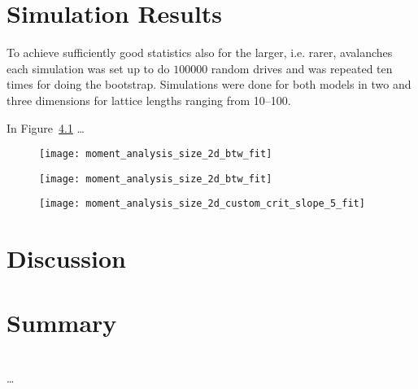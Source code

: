 \section{Simulation Results}
\label{sec:results}
To achieve sufficiently good statistics also for the larger, i.e. rarer, avalanches each simulation was set up to
do $100000$ random drives and was repeated ten times for doing the bootstrap. Simulations were done for both models
in two and three dimensions for lattice lengths ranging from \SIrange{10}{100}{}.

In Figure~\ref{} \dots %

\begin{figure}[htb]
    \centering
    \texttt{[image: moment\_analysis\_size\_2d\_btw\_fit]}
    \caption{}
    \label{fig:}
\end{figure}


\begin{figure}[htb]
    \centering
    \texttt{[image: moment\_analysis\_size\_2d\_btw\_fit]}
    \caption{}
    \label{fig:}
\end{figure}
\begin{figure}[htb]
    \centering
    \texttt{[image: moment\_analysis\_size\_2d\_custom\_crit\_slope\_5\_fit]}
    \caption{}
    \label{fig:}
\end{figure}


\section{Discussion}
\label{sec:discussion}


\section{Summary}
\label{sec:summary}


\appendix*

\section{}
\label{sec:}
\subsection{}
\dots
